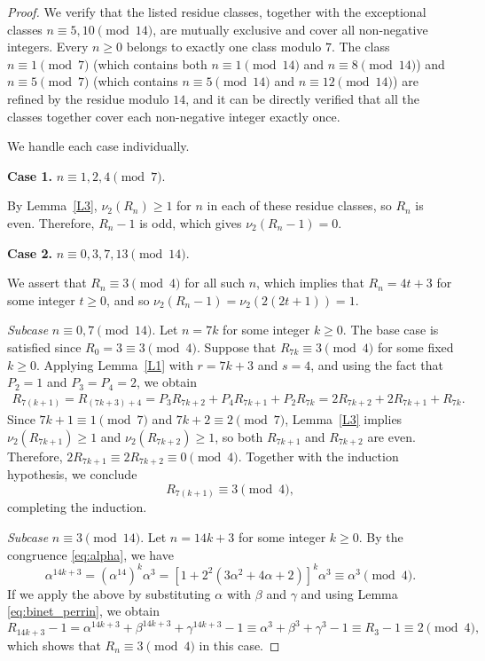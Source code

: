 \documentclass[11pt,a4paper]{article}
\numberwithin{equation}{section}
\numberwithin{table}{section}
\numberwithin{figure}{section}
\begin{document}
\begin{proof}
	We verify that the listed residue classes, 
	together with the exceptional classes 
	$n\equiv 5,10\pmod{14}$, are mutually exclusive and 
	cover all non-negative integers. Every $n\ge 0$ belongs 
	to exactly one class modulo $7$. The class 
	$n\equiv 1\pmod{7}$ (which contains both 
	$n\equiv 1\pmod{14}$ and $n\equiv 8\pmod{14}$) and 
	$n\equiv 5\pmod{7}$ (which contains 
	$n\equiv 5\pmod{14}$ and $n\equiv 12\pmod{14}$) are 
	refined by the residue modulo $14$, and it can be 
	directly verified that all the classes together cover each 
	non-negative integer exactly once.
	
	We handle each case individually.
	
	\medskip
	\noindent\textbf{Case 1.} $n\equiv 1,2,4\pmod{7}$.
	
	By Lemma~\ref{L3}, $\nu_2(R_n)\ge 1$ for $n$ in each 
	of these residue classes, so $R_n$ is even. Therefore, 
	$R_n-1$ is odd, which gives $\nu_2(R_n-1)=0$.
	
	\medskip
	\noindent\textbf{Case 2.} $n\equiv 0,3,7,13\pmod{14}$.
	
	We assert that $R_n\equiv 3\pmod{4}$ for all such $n$, which 
	implies that $R_{n}=4t+3$ for some integer $t\ge 0$, and so $\nu_2(R_n-1)=\nu_{2}(2(2t+1))=1$. 
	
	\smallskip
	\textit{Subcase} $n\equiv 0,7\pmod{14}$. Let $n=7k$ for some integer $k\ge 0$. 
	The base case is satisfied since $R_0=3\equiv 3\pmod{4}$. Suppose that $R_{7k}\equiv 3\pmod{4}$ for some fixed 
	$k\ge 0$. Applying Lemma~\ref{L1} with $r=7k+3$ and 
	$s=4$, and using the fact that $P_2=1$ and $P_3=P_4=2$, we obtain
	\begin{align*}
		R_{7(k+1)} = R_{(7k+3)+4} = P_3 R_{7k+2}+P_4 R_{7k+1}+P_2 R_{7k}= 2R_{7k+2}+2R_{7k+1}+R_{7k}.
	\end{align*}
	Since $7k+1\equiv 1\pmod{7}$ and $7k+2\equiv 2\pmod{7}$, 
	Lemma~\ref{L3} implies $\nu_2(R_{7k+1})\ge 1$ and 
	$\nu_2(R_{7k+2})\ge 1$, so both $R_{7k+1}$ and 
	$R_{7k+2}$ are even. Therefore, $2R_{7k+1}\equiv 2R_{7k+2} \equiv 0
	\pmod{4}$. Together 
	with the induction hypothesis, 
	we conclude
	\begin{equation*}
		R_{7(k+1)}\equiv 3\pmod{4},
	\end{equation*}
	completing the induction.
	
	\smallskip
	\textit{Subcase} $n\equiv 3 \pmod {14}$.
	Let $n=14k+3$ for some integer $k\ge 0$. By the congruence \eqref{eq:alpha}, we have 
	$$
	\alpha^{14k+3}=(\alpha^{14} )^k \alpha^3=[1+2^2(3\alpha^2+4\alpha+2)]^k \alpha^3\equiv \alpha^3\pmod {4}.
	$$
	If we apply the above by substituting $\alpha$ with $\beta$ and $\gamma$ and using Lemma \ref{eq:binet_perrin}, we obtain
	$$
	R_{14k+3}-1=\alpha^{14k+3}+\beta^{14k+3}+\gamma^{14k+3}-1\equiv \alpha^3+\beta^3+\gamma^3-1\equiv R_3-1\equiv 2\pmod 4,
	$$
	which shows that $R_{n}\equiv 3\pmod{4}$ in this case. 
	

\end{proof}
\end{document}
